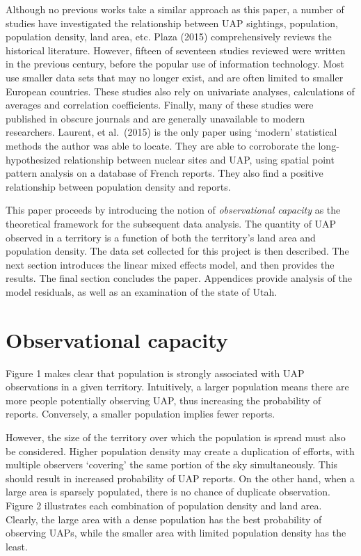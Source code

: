 \documentclass[]{elsarticle} %
\begin{document}
Although no previous works take a similar approach as this paper, a
number of studies have investigated the relationship between UAP
sightings, population, population density, land area, etc. Plaza (2015)
comprehensively reviews the historical literature. However, fifteen of
seventeen studies reviewed were written in the previous century, before
the popular use of information technology. Most use smaller data sets
that may no longer exist, and are often limited to smaller European
countries. These studies also rely on univariate analyses, calculations
of averages and correlation coefficients. Finally, many of these studies
were published in obscure journals and are generally unavailable to
modern researchers. Laurent, et al.~(2015) is the only paper using
`modern' statistical methods the author was able to locate. They are
able to corroborate the long-hypothesized relationship between nuclear
sites and UAP, using spatial point pattern analysis on a database of
French reports. They also find a positive relationship between
population density and reports.

This paper proceeds by introducing the notion of \emph{observational
capacity} as the theoretical framework for the subsequent data analysis.
The quantity of UAP observed in a territory is a function of both the
territory's land area and population density. The data set collected for
this project is then described. The next section introduces the linear
mixed effects model, and then provides the results. The final section
concludes the paper. Appendices provide analysis of the model residuals,
as well as an examination of the state of Utah.

\hypertarget{observational-capacity}{%
\section{Observational capacity}\label{observational-capacity}}

Figure 1 makes clear that population is strongly associated with UAP
observations in a given territory. Intuitively, a larger population
means there are more people potentially observing UAP, thus increasing
the probability of reports. Conversely, a smaller population implies
fewer reports.

However, the size of the territory over which the population is spread
must also be considered. Higher population density may create a
duplication of efforts, with multiple observers `covering' the same
portion of the sky simultaneously. This should result in increased
probability of UAP reports. On the other hand, when a large area is
sparsely populated, there is no chance of duplicate observation. Figure
2 illustrates each combination of population density and land area.
Clearly, the large area with a dense population has the best probability
of observing UAPs, while the smaller area with limited population
density has the least.
\end{document}
